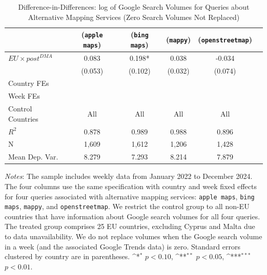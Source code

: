 \documentclass[11pt]{article}
\begin{document}
	
	\begin{table}
		\centering
		\def\sym#1{\ifmmode^{#1}\else\(^{#1}\)\fi}
		\caption{\label{tab:did_competitor2} Difference-in-Differences: log of Google Search Volumes for Queries about Alternative Mapping Services (Zero Search Volumes Not Replaced)}
		\begin{threeparttable}
			\begin{tabular}{lccccc}
				\hline \noalign{\smallskip} 
				
				&(\texttt{apple maps})   &(\texttt{bing maps})   &(\texttt{mappy})   &(\texttt{openstreetmap})   \\
				\midrule
				$ EU \times post^{DMA} $ &       0.083   &       0.198*  &       0.038   &      -0.034   \\
				&     (0.053)   &     (0.102)   &     (0.032)   &     (0.074)   \\
				
				Country FEs         &  \checkmark   &  \checkmark   &  \checkmark   &  \checkmark   \\
				Week FEs            &  \checkmark   &  \checkmark   &  \checkmark   &  \checkmark   \\
				Control Countries   &         All   &         All   &         All   &         All   \\
				$ R ^2 $            &       0.878   &       0.989   &       0.988   &       0.896   \\
				N                   &       1,609   &       1,612   &       1,206   &       1,428   \\
				Mean Dep. Var.      &       8.279   &       7.293   &       8.214   &       7.879   \\
				\midrule
			\end{tabular}
			
			\begin{tablenotes}
				\item \footnotesize \emph{Notes}: The sample includes weekly data from January 2022 to December 2024. The four columns use the same specification with country and week fixed effects for four queries associated with alternative mapping services: \texttt{apple maps}, \texttt{bing maps}, \texttt{mappy}, and \texttt{openstreetmap}. We restrict the control group to all non-EU countries that have information about Google search volumes for all four queries. The treated group comprises 25 EU countries, excluding Cyprus and Malta due to data unavailability. We do not replace volumes when the Google search volume in a week (and the associated Google Trends data) is zero. Standard errors clustered by country are in parentheses. \sym{*} \(p<0.10\), \sym{**} \(p<0.05\), \sym{***}  \(p<0.01\).   
			\end{tablenotes}
		\end{threeparttable}
	\end{table}
	
\end{document}
